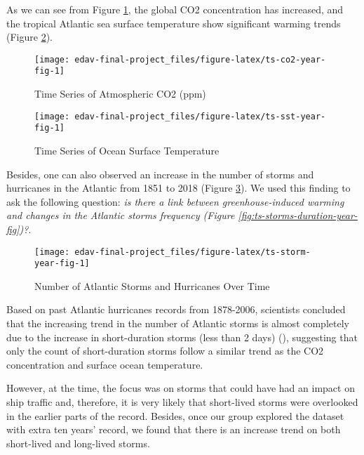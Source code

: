 \documentclass[]{book}
\begin{document}
As we can see from Figure \ref{fig:ts-co2-year-fig}, the global CO2 concentration has increased, and the tropical Atlantic sea surface temperature show significant warming trends (Figure \ref{fig:ts-sst-year-fig}).

\begin{figure}

{\centering \texttt{[image: edav-final-project\_files/figure-latex/ts-co2-year-fig-1]} 

}

\caption{Time Series of Atmospheric CO2 (ppm)}\label{fig:ts-co2-year-fig}
\end{figure}

\begin{figure}

{\centering \texttt{[image: edav-final-project\_files/figure-latex/ts-sst-year-fig-1]} 

}

\caption{Time Series of Ocean Surface Temperature}\label{fig:ts-sst-year-fig}
\end{figure}

Besides, one can also observed an increase in the number of storms and hurricanes in the Atlantic from 1851 to 2018 (Figure \ref{fig:ts-storm-year-fig}). We used this finding to ask the following question: \emph{is there a link between greenhouse-induced warming and changes in the Atlantic storms frequency (Figure \ref{fig:ts-storms-duration-year-fig})?}.

\begin{figure}

{\centering \texttt{[image: edav-final-project\_files/figure-latex/ts-storm-year-fig-1]} 

}

\caption{Number of Atlantic Storms and Hurricanes Over Time}\label{fig:ts-storm-year-fig}
\end{figure}

Based on past Atlantic hurricanes records from 1878-2006, scientists concluded that the increasing trend in the number of Atlantic storms is almost completely due to the increase in short-duration storms (less than 2 days) (\citet{Landsea2010}), suggesting that only the count of short-duration storms follow a similar trend as the CO2 concentration and surface ocean temperature.

However, at the time, the focus was on storms that could have had an impact on ship traffic and, therefore, it is very likely that short-lived storms were overlooked in the earlier parts of the record. Besides, once our group explored the dataset with extra ten years' record, we found that there is an increase trend on both short-lived and long-lived storms.
\end{document}
